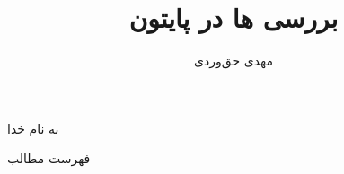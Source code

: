 \documentclass[aspectratio=169]{beamer}
\title{بررسی \lr{Context Manager}ها در پایتون}
\author{مهدی حق‌وردی}
\institute{
\\
\texttt{[image: logos/logo]}\\
دانشگاه اصفهان
}
\date{}
\begin{document}
    
    \begin{frame}[plain]
        \begin{center}
            به نام خدا
        \end{center}
        
        \maketitle
        
        
    \end{frame}
    
    \setcounter{framenumber}{0}
    
    
    \raggedleft
    
    \begin{frame}{فهرست مطالب}
        \begin{flushright}
            \tableofcontents
        \end{flushright}
    \end{frame}
    
    
    
    
\end{document}
